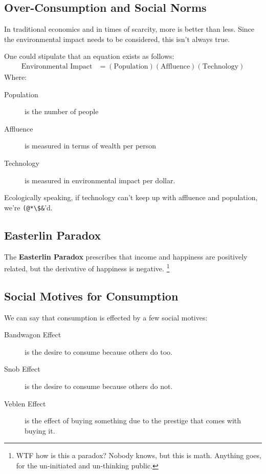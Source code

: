                 \subsection{Over-Consumption and Social Norms} %
                \label{sub:over_consumption_and_social_norms}
                    In traditional economics and in times of scarcity, more is better than less.
                    Since the environmental impact needs to be considered, this isn't always true.

                    One could stipulate that an equation exists as follows:
                    \begin{align*}
                        \text{Environmental Impact} &= (\text{Population})(\text{Affluence})(\text{Technology})
                    \end{align*}
                    Where:
                    \begin{description}
                        \item[Population] is the number of people
                        \item[Affluence] is measured in terms of wealth per person
                        \item[Technology] is measured in environmental impact per dollar.
                    \end{description}
                    Ecologically speaking, if  technology can't keep up with affluence and population, we're \verb|(@*\$&|'d.
                \subsection{Easterlin Paradox} %
                \label{sub:easterlin_paradox}
                    The \textbf{Easterlin Paradox} prescribes that income and happiness are positively related, but the derivative of happiness is negative.
                    \footnote{WTF how is this a paradox? Nobody knows, but this is math. Anything goes, for the un-initiated and un-thinking public.}
                \subsection{Social Motives for Consumption} %
                \label{sub:social_motives_for_consumption}
                    We can say that consumption is effected by a few social motives:
                    \begin{description}
                        \item[Bandwagon Effect] is the desire to consume because others do too.
                        \item[Snob Effect] is the desire to consume because others do not.
                        \item[Veblen Effect] is the effect of buying something due to the prestige that comes with buying it.
                    \end{description}
